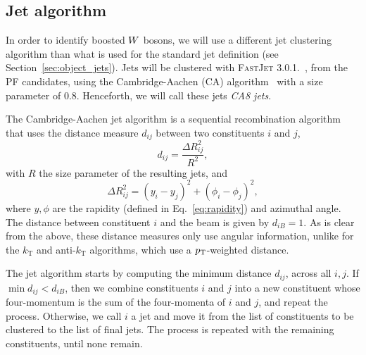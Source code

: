 \subsection{Jet algorithm}

In order to identify boosted $W$ bosons,  we will use a different jet clustering algorithm
than what is used for the standard jet definition (see Section~\ref{sec:object_jets}). 
Jets will be clustered with \textsc{FastJet 3.0.1.}~\cite{Cacciari:2011ma}, from the PF candidates,
using the Cambridge-Aachen (CA) algorithm~\cite{Dokshitzer:1997in} with a size parameter of 0.8.
Henceforth, we will call these jets \textit{CA8 jets}. 

\begin{cajet} \theoremstyle{definition}
The Cambridge-Aachen jet algorithm is a sequential recombination algorithm that uses the
distance measure $d_{ij}$ between two constituents $i$ and $j$,
\begin{equation}
d_{ij} = \frac{\Delta R_{ij}^2}{R^2}, \label{eq:CA_distance}
\end{equation}
with $R$ the size parameter of the resulting jets, and
\begin{equation}
\Delta R_{ij}^2 = (y_i - y_j)^2 + (\phi_i - \phi_j)^2 ,
\label{eq:DeltaR_jet_algo}
\end{equation}
where $y, \phi$ are the rapidity (defined in Eq.~\ref{eq:rapidity}) and azimuthal angle. 
The distance between constituent $i$ and the beam is given by $d_{iB} = 1$.
As is clear from the above, these distance measures only use angular information, unlike for the
$k_\mathrm{T}$ and anti-$k_\mathrm{T}$ algorithms, which use a $p_{\mathrm{T}}$-weighted distance. 

The jet algorithm starts by computing the minimum distance $d_{ij}$, across all $i,j$. If $\min
d_{ij} < d_{iB}$, then we combine constituents $i$ and $j$ into a new constituent whose
four-momentum is the sum of the four-momenta of $i$ and $j$, and repeat the process. Otherwise, we
call $i$ a jet and move it from the list of constituents to be clustered to the list of final jets.
The process is repeated with the remaining constituents, until none remain.
\end{cajet}

